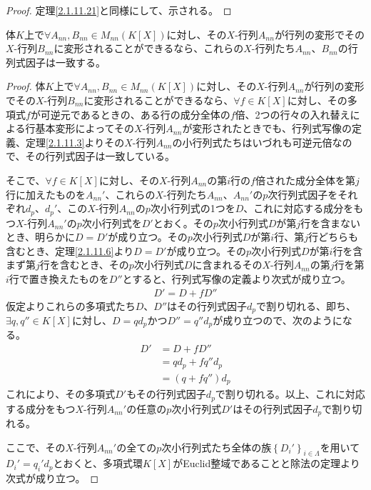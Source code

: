 \documentclass[dvipdfmx]{jsarticle}
\begin{document}
\begin{proof}
定理\ref{2.1.11.21}と同様にして、示される。
\end{proof}
\begin{thm}\label{2.2.8.5}
体$K$上で$\forall A_{nn},B_{nn} \in M_{nn}\left( K[ X] \right)$に対し、その$X$-行列$A_{nn}$が行列の変形でその$X$-行列$B_{nn}$に変形されることができるなら、これらの$X$-行列たち$A_{nn}$、$B_{nn}$の行列式因子は一致する。
\end{thm}
\begin{proof}
体$K$上で$\forall A_{nn},B_{nn} \in M_{nn}\left( K[ X] \right)$に対し、その$X$-行列$A_{nn}$が行列の変形でその$X$-行列$B_{nn}$に変形されることができるなら、$\forall f \in K[ X]$に対し、その多項式$f$が可逆元であるときの、ある行の成分全体の$f$倍、2つの行々の入れ替えによる行基本変形によってその$X$-行列$A_{nn}$が変形されたときでも、行列式写像の定義、定理\ref{2.1.11.3}よりその$X$-行列$A_{nn}$の小行列式たちはいづれも可逆元倍なので、その行列式因子は一致している。\par
そこで、$\forall f \in K[ X]$に対し、その$X$-行列$A_{nn}$の第$i$行の$f$倍された成分全体を第$j$行に加えたものを$A_{nn}'$、これらの$X$-行列たち$A_{nn}$、$A_{nn}'$の$p$次行列式因子をそれぞれ$d_{p}$、$d_{p}'$、この$X$-行列$A_{nn}$の$p$次小行列式の1つを$D$、これに対応する成分をもつ$X$-行列$A_{nn}'$の$p$次小行列式を$D'$とおく。その$p$次小行列式$D$が第$j$行を含まないとき、明らかに$D = D'$が成り立つ。その$p$次小行列式$D$が第$i$行、第$j$行どちらも含むとき、定理\ref{2.1.11.6}より$D = D'$が成り立つ。その$p$次小行列式$D$が第$i$行を含まず第$j$行を含むとき、その$p$次小行列式$D$に含まれるその$X$-行列$A_{nn}$の第$j$行を第$i$行で置き換えたものを$D''$とすると、行列式写像の定義より次式が成り立つ。
\begin{align*}
D' = D + fD''
\end{align*}
仮定よりこれらの多項式たち$D$、$D''$はその行列式因子$d_{p}$で割り切れる、即ち、$\exists q,q'' \in K[ X]$に対し、$D = qd_{p}$かつ$D'' = q''d_{p}$が成り立つので、次のようになる。
\begin{align*}
D' &= D + fD''\\
&= qd_{p} + fq''d_{p}\\
&= \left( q + fq'' \right)d_{p}
\end{align*}
これにより、その多項式$D'$もその行列式因子$d_{p}$で割り切れる。以上、これに対応する成分をもつ$X$-行列$A_{nn}'$の任意の$p$次小行列式$D'$はその行列式因子$d_{p}$で割り切れる。\par
ここで、その$X$-行列$A_{nn}'$の全ての$p$次小行列式たち全体の族$\left\{ D_{i}' \right\}_{i \in \varLambda}$を用いて$D_{i}' = q_{i}'d_{p}$とおくと、多項式環$K[ X]$がEuclid整域であることと除法の定理より次式が成り立つ。

\end{proof}
\end{document}
